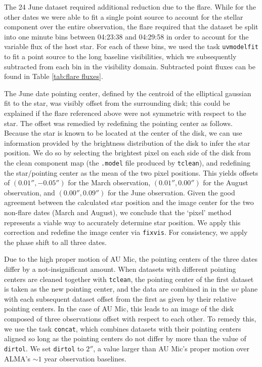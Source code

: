 \documentclass[12pt,oneside]{book}
\begin{document}
The 24 June dataset required additional reduction due to the flare. While for
the other dates we were able to fit a single point source to account for the stellar
component over the entire observation, the flare required that the dataset be
split into one minute bins between 04:23:38 and 04:29:58 in order to account for
the variable flux of the host star. For each of these bins, we used the task
\texttt{uvmodelfit} to fit a point source to the long baseline visibilities,
which we subsequently subtracted from each bin in the visibility domain.
Subtracted point fluxes can be found in Table \ref{tab:flare fluxes}.

The June date pointing center, defined by the centroid of the elliptical
gaussian fit to the star, was visibly offset from the surrounding disk; this
could be explained if the flare referenced above were not symmetric with respect
to the star. The offset was remedied by redefining the pointing center as
follows. Because the star is known to be located at the center of the disk, we
can use information provided by the brightness distribution of the disk to infer
the star position. We do so by selecting the brightest pixel on each side of the
disk from the clean component map (the \texttt{.model} file produced by
\texttt{tclean}), and redefining the star/pointing center as the mean of the two
pixel positions. This yields offsets of $(0.01'', -0.05'')$ for the March
observation, $(0.01'', 0.00'')$ for the August observation, and $(0.00'',
0.09'')$ for the June observation. Given the good agreement between the
calculated star position and the image center for the two non-flare dates (March
and August), we conclude that the `pixel' method represents a viable way to
accurately determine star position. We apply this correction and redefine the
image center via \texttt{fixvis}. For consistency, we apply the phase shift to
all three dates.

Due to the high proper motion of AU Mic, the pointing centers of the three dates
differ by a not-insignificant amount. When datasets with different pointing
centers are cleaned together with \texttt{tclean}, the pointing center of the
first dataset is taken as the new pointing center, and the data are combined in
in the $uv$ plane with each subsequent dataset offset from the first as given by
their relative pointing centers. In the case of AU Mic, this leads to an  image
of the disk composed of three observations offset with respect to each other. To
remedy this, we use the task \texttt{concat}, which combines datasets with their
pointing centers aligned so long as the pointing centers do not differ by more
than the value of \texttt{dirtol}. We set \texttt{dirtol} to $ 2''$, a value
larger than  AU Mic's proper motion over ALMA's $\sim 1$ year observation
baselines.
\end{document}
